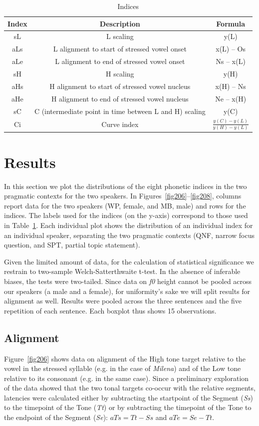 \begin{table}[h]
\centering
\resizebox{\linewidth}{!} {
\begin{tabular}{c c c}
Index & Description & Formula \\
\hline
sL & L scaling & y(L) \\
aLs	& L alignment to start of stressed vowel onset & x(L) – Os \\
aLe	& L alignment to end of stressed vowel onset & Ns – x(L) \\
sH	& H scaling	& y(H) \\
aHs	& H alignment to start of stressed vowel nucleus & x(H) – Ns \\
aHe	& H alignment to end of stressed vowel nucleus & Ne – x(H) \\
sC	& C (intermediate point in time between L and H) scaling & y(C) \\
Ci	& Curve index & \(\frac{y(C)-y(L)}{y(H)-y(L)}\) \\
\end{tabular}
}
\caption{Indices}
\label{tab21}\end{table}

\section{Results}\label{sec23}
In this section we plot the distributions of the eight phonetic indices in the two pragmatic contexts for the two speakers. In Figures~\ref{fig206}--\ref{fig208}, columns report data for the two speakers (WP, female, and MB, male) and rows for the indices. The labels used for the indices (on the y-axis) correspond to those used in Table~\ref{tab21}. Each individual plot shows the distribution of an individual index for an individual speaker, separating the two pragmatic contexts (QNF, narrow focus question, and SPT, partial topic statement).

Given the limited amount of data, for the calculation of statistical significance we restrain to two-sample Welch-Satterthwaite t-test. In the absence of inferable biases, the tests were two-tailed. Since data on \textit{f0} height cannot be pooled across our speakers (a male and a female), for uniformity's sake we will split results for alignment as well. Results were pooled across the three sentences and the five repetition of each sentence. Each boxplot thus shows 15 observations.

\subsection{Alignment}\label{sec231}
Figure~\ref{fig206} shows data on alignment of the High tone target relative to the vowel in the stressed syllable (e.g. \textipa{[E]} in the case of \textit{Milena}) and of the Low tone relative to its consonant (e.g. \textipa{[l]} in the same case). Since a preliminary exploration of the data showed that the two tonal targets co-occur with the relative segments, latencies were calculated either by subtracting the startpoint of the Segment (\textit{Ss}) to the timepoint of the Tone (\textit{Tt}) or by subtracting the timepoint of the Tone to the endpoint of the Segment (\textit{Se}): $ aTs = Tt - Ss $ and $ aTe = Se - Tt $. 


